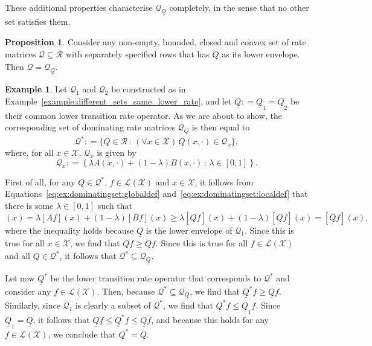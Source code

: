 \documentclass[10pt,a4paper]{paper}
\theoremstyle{definition}
\newtheorem{exmp}{Example}%
\newtheorem{proposition}[theorem]{Proposition}
\newcommand{\states}{\mathcal{X}}
\newcommand{\gambles}{\mathcal{L}}
\newcommand{\gamblesX}{\gambles(\states)}
\newcommand{\rateset}{\mathcal{Q}}
\newcommand{\lrate}{\underline{Q}}
\newcommand{\coloneqq}{:\!=}
\begin{document}
\noindent
These additional properties characterise $\rateset_{\lrate}$ completely, in the sense that no other set satisfies them.

\begin{proposition}\label{prop:dominating_unique_characterization}
Consider any non-empty, bounded, closed and convex set of rate matrices $\rateset\subseteq\mathcal{R}$ with separately specified rows that has $\lrate$ as its lower envelope. Then $\rateset=\rateset_{\lrate}$.
\end{proposition}

\begin{exmp}\label{ex:dominatingset}
Let $\rateset_1$ and $\rateset_2$ be constructed as in Example~\ref{example:different_sets_same_lower_rate}, and let $\lrate\coloneqq\lrate_1=\lrate_2$ be their common lower transition rate operator. As we are about to show, the corresponding set of dominating rate matrices $\rateset_{\lrate}$ is then equal to
\begin{equation}\label{eq:ex:dominatingset:globaldef}
\rateset^* \coloneqq \{Q\in\mathcal{R}\,:\,(\forall x\in\states)\, Q(x,\cdot)\in\rateset_x\},
\end{equation}
where, for all $x\in\states$, $\rateset_x$ is given by
\begin{equation}\label{eq:ex:dominatingset:localdef}
\rateset_x \coloneqq \left\{\lambda A(x,\cdot)+(1-\lambda)B(x,\cdot)\,:\,\lambda\in[0,1]\right\}.
\end{equation}

First of all, for any $Q\in\rateset^*$, $f\in\gamblesX$ and $x\in\states$, it follows from Equations~\eqref{eq:ex:dominatingset:globaldef} and~\eqref{eq:ex:dominatingset:localdef} that there is some $\lambda\in[0,1]$ such that
\begin{equation*}
[Qf](x)=\lambda[Af](x)+(1-\lambda)[Bf](x)
\geq\lambda[\lrate f](x)+(1-\lambda)[\lrate f](x)
=[\lrate f](x),
\end{equation*}
where the inequality holds because $\lrate$ is the lower envelope of $\rateset_1$. Since this is true for all $x\in\states$, we find that $Qf\geq\lrate f$. Since this is true for all $f\in\gamblesX$ and all $Q\in\rateset^*$, it follows that $\rateset^*\subseteq\rateset_{\lrate}$. 


Let now $\lrate^*$ be the lower transition rate operator that corresponds to $\rateset^*$ and consider any $f\in\gamblesX$. Then, because $\rateset^*\subseteq\rateset_{\lrate}$, we find that $\lrate^*f\geq\lrate f$. Similarly, since $\rateset_1$ is clearly a subset of $\rateset^*$, we find that $\lrate^*f\leq\lrate_1f$. Since $\lrate_1=\lrate$, it follows that $\lrate f\leq \lrate^*f\leq \lrate f$, and because this holds for any $f\in\gamblesX$, we conclude that $\lrate^*=\lrate$.



\end{exmp}
\end{document}
